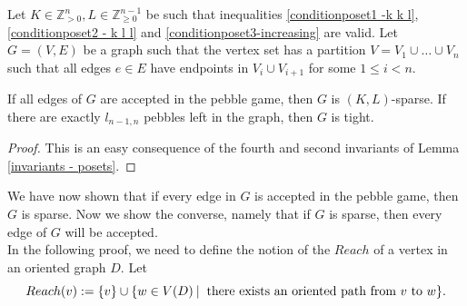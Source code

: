 \documentclass{article}
\begin{document}
\begin{corollary}
 Let $K\in \mathbb{Z}_{>0}^{n}, L\in \mathbb{Z}_{\geq 0}^{n-1}$ be such that inequalities \eqref{conditionposet1 -k k l}, \eqref{conditionposet2 - k l l} and \eqref{conditionposet3-increasing} are valid. Let $G=(V,E)$ be a graph such that the vertex set has a partition $V=V_1\cup \dots \cup V_n$ such that all edges $e\in E$ have endpoints in $V_{i} \cup V_{i+1}$ for some $1 \leq i < n$.  
 
 If all edges of $G$ are accepted in the pebble game, then $G$ is  $(K,L)$-sparse. If there are exactly $l_{n-1,n}$ pebbles left in the graph, then $G$ is tight.
\end{corollary}
\begin{proof}
This is an easy consequence of the fourth and second invariants of Lemma \ref{invariants - posets}.
\end{proof}

We have now shown that if every edge in $G$ is accepted in the pebble game, then $G$ is sparse. Now we show the converse, namely that if $G$ is sparse, then every edge of $G$ will be accepted.\\ In the following proof, we need to define the notion of the $Reach$ of a vertex in an oriented graph $D$. Let 
\[
\textup{Reach}(v):=\{v\} \cup \{w\in V(D) \: \vert \: \mbox{ there exists an oriented path from } v \mbox{ to } w\}.
\]
\end{document}
